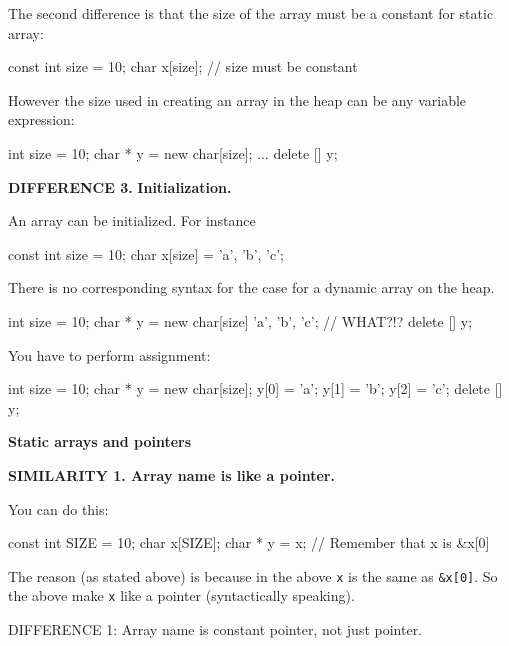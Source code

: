 The second difference is that the size of the array must be a constant
for static array:

\begin{consolethree}[escapeinside=||]
const int size = 10;
char x[size]; // size must be constant
\end{consolethree}

However the size used in creating an array in the heap can be any
variable expression:

\begin{consolethree}[escapeinside=||]
int size = 10;
char * y = new char[size];
...
delete [] y;
\end{consolethree}

\textbf{DIFFERENCE 3.} \textbf{Initialization.}

An array can be initialized. For instance

\begin{consolethree}[escapeinside=||]
const int size = 10;
char x[size] = {'a', 'b', 'c'};
\end{consolethree}

There is no corresponding syntax for the case for a dynamic array on the
heap.

\begin{consolethree}[escapeinside=||]
int size = 10;
char * y = new char[size] {'a', 'b', 'c'}; // WHAT?!?
delete [] y;
\end{consolethree}

You have to perform assignment:

\begin{consolethree}[escapeinside=||]
int size = 10;
char * y = new char[size];
y[0] = 'a';
y[1] = 'b';
y[2] = 'c';
delete [] y;
\end{consolethree}

\textbf{Static arrays and pointers}

\textbf{SIMILARITY 1. Array name is like a pointer.}

You can do this:

\begin{consolethree}[escapeinside=||]
const int SIZE = 10;
char x[SIZE];
char * y = x; // Remember that x is &x[0]
\end{consolethree}

The reason (as stated above) is because in the above \texttt{x} is the
same as \texttt{\&x[0]}. So the above make \texttt{x} like a pointer
(syntactically speaking).

DIFFERENCE 1: Array name is constant pointer, not just pointer.

